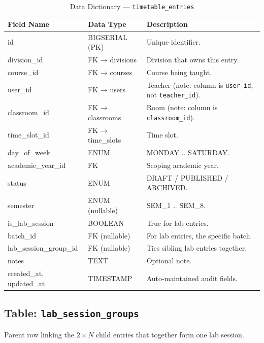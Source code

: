 \begin{table}[H]
    \centering
    \renewcommand{\arraystretch}{1.5}
    \begin{tabular}{|p{3.8cm}|p{2.5cm}|p{7.2cm}|}
        \hline
        \textbf{Field Name} & \textbf{Data Type} & \textbf{Description} \\
        \hline
        id & BIGSERIAL (PK) & Unique identifier. \\
        \hline
        division\_id & FK → divisions & Division that owns this entry. \\
        \hline
        course\_id & FK → courses & Course being taught. \\
        \hline
        user\_id & FK → users & Teacher (note: column is \texttt{user\_id}, not \texttt{teacher\_id}). \\
        \hline
        classroom\_id & FK → classrooms & Room (note: column is \texttt{classroom\_id}). \\
        \hline
        time\_slot\_id & FK → time\_slots & Time slot. \\
        \hline
        day\_of\_week & ENUM & MONDAY .. SATURDAY. \\
        \hline
        academic\_year\_id & FK & Scoping academic year. \\
        \hline
        status & ENUM & DRAFT / PUBLISHED / ARCHIVED. \\
        \hline
        semester & ENUM (nullable) & SEM\_1 .. SEM\_8. \\
        \hline
        is\_lab\_session & BOOLEAN & True for lab entries. \\
        \hline
        batch\_id & FK (nullable) & For lab entries, the specific batch. \\
        \hline
        lab\_session\_group\_id & FK (nullable) & Ties sibling lab entries together. \\
        \hline
        notes & TEXT & Optional note. \\
        \hline
        created\_at, updated\_at & TIMESTAMP & Auto-maintained audit fields. \\
        \hline
    \end{tabular}
    \caption{Data Dictionary --- \texttt{timetable\_entries}}
    \label{tab:dd_timetable_entries}
\end{table}

\subsection{Table: \texttt{lab\_session\_groups}}
Parent row linking the $2 \times N$ child entries that together form one lab session.

